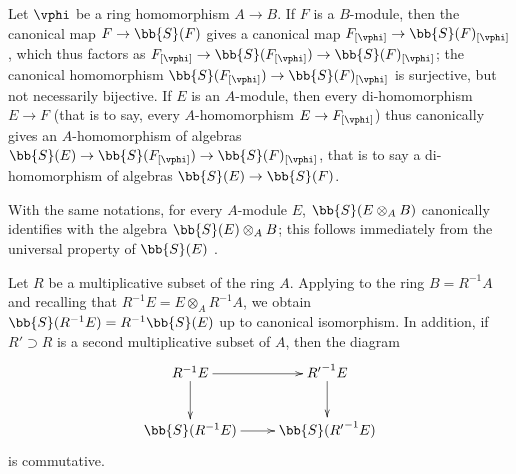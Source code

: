 \begin{env}[1.7.2]
\label{II.1.7.2}
Let $\vphi$ be a ring homomorphism $A\to B$.
If $F$ is a $B$-module, then the canonical map $F\to\bb{S}(F)$ gives a canonical map $F_{[\vphi]}\to\bb{S}(F)_{[\vphi]}$, which thus factors as $F_{[\vphi]}\to\bb{S}(F_{[\vphi]})\to\bb{S}(F)_{[\vphi]}$; the canonical homomorphism $\bb{S}(F_{[\vphi]})\to\bb{S}(F)_{[\vphi]}$ is surjective, but not necessarily bijective.
If $E$ is an $A$-module, then every di-homomorphism $E\to F$ (that is to say, every $A$-homomorphism $E\to F_{[\vphi]}$) thus canonically gives an $A$-homomorphism of algebras $\bb{S}(E)\to\bb{S}(F_{[\vphi]})\to\bb{S}(F)_{[\vphi]}$, that is to say a di-homomorphism of algebras $\bb{S}(E)\to\bb{S}(F)$.

With the same notations, for every $A$-module $E$, $\bb{S}(E\otimes_A B)$ canonically identifies with the algebra $\bb{S}(E)\otimes_A B$; this follows immediately from the universal property of $\bb{S}(E)$ .
\end{env}

\begin{env}[1.7.3]
\label{II.1.7.3}
Let $R$ be a multiplicative subset of the ring $A$. Applying  to the ring $B=R^{-1}A$ and recalling that $R^{-1}E=E\otimes_A R^{-1}A$, we obtain $\bb{S}(R^{-1}E)=R^{-1}\bb{S}(E)$ up to canonical isomorphism.
In addition, if $R'\supset R$ is a second multiplicative subset of $A$, then the diagram
\[
  \xymatrix{
    {R^{-1}E}\ar[r]\ar[d] & {{R'}^{-1}E}\ar[d]\\
    {\bb{S}(R^{-1}E)}\ar[r] & {\bb{S}({R'}^{-1}E)}
  }
\]
is commutative.
\end{env}


